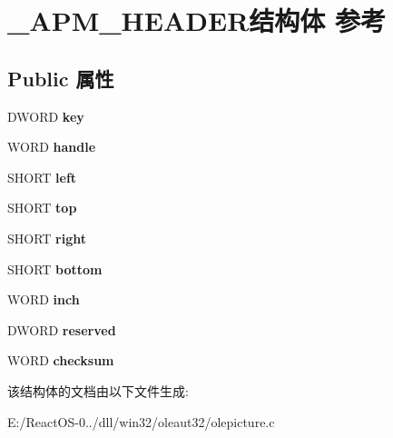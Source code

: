 \hypertarget{struct___a_p_m___h_e_a_d_e_r}{}\section{\+\_\+\+A\+P\+M\+\_\+\+H\+E\+A\+D\+E\+R结构体 参考}
\label{struct___a_p_m___h_e_a_d_e_r}
\subsection*{Public 属性}
\begin{DoxyCompactItemize}
\item 
\mbox{\label{struct___a_p_m___h_e_a_d_e_r_a83cd4d3c9630e023ceebecc2341a2675}} 
D\+W\+O\+RD {\bfseries key}
\item 
\mbox{\label{struct___a_p_m___h_e_a_d_e_r_a163458eed65867eb18a5f3e890c9bdd7}} 
W\+O\+RD {\bfseries handle}
\item 
\mbox{\label{struct___a_p_m___h_e_a_d_e_r_acf5c556276d369c039288b103c5c263d}} 
S\+H\+O\+RT {\bfseries left}
\item 
\mbox{\label{struct___a_p_m___h_e_a_d_e_r_a5afbbc7661180e5a68abd54245a5e151}} 
S\+H\+O\+RT {\bfseries top}
\item 
\mbox{\label{struct___a_p_m___h_e_a_d_e_r_a1598bcf9e91c398fb7d2a2642c652034}} 
S\+H\+O\+RT {\bfseries right}
\item 
\mbox{\label{struct___a_p_m___h_e_a_d_e_r_a4d7a65382110ca2b83e816b5b229f9dd}} 
S\+H\+O\+RT {\bfseries bottom}
\item 
\mbox{\label{struct___a_p_m___h_e_a_d_e_r_a0e3f2bb397797a594290d6ce302d0c19}} 
W\+O\+RD {\bfseries inch}
\item 
\mbox{\label{struct___a_p_m___h_e_a_d_e_r_ad3c43132632d82443ae36f2c09233e78}} 
D\+W\+O\+RD {\bfseries reserved}
\item 
\mbox{\label{struct___a_p_m___h_e_a_d_e_r_ae06a9e5f0acfcf0d9ebfd594bcb2f746}} 
W\+O\+RD {\bfseries checksum}
\end{DoxyCompactItemize}


该结构体的文档由以下文件生成\+:\begin{DoxyCompactItemize}
\item 
E\+:/\+React\+O\+S-\/0../dll/win32/oleaut32/olepicture.\+c\end{DoxyCompactItemize}
